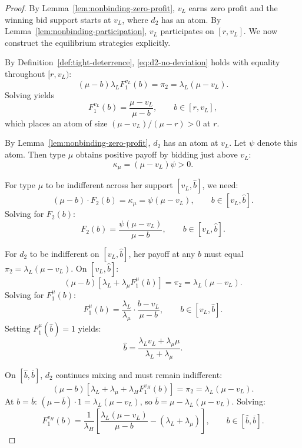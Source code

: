 \documentclass[11pt]{article}
\theoremstyle{plain}
\theoremstyle{definition}
\theoremstyle{plain}
\theoremstyle{plain}
\theoremstyle{plain}
\theoremstyle{plain}
\numberwithin{equation}{section}
\begin{document}
\begin{proof}
By Lemma~\ref{lem:nonbinding-zero-profit}, $v_L$ earns zero profit and the winning bid support starts at $v_L$, where $d_2$ has an atom. By Lemma~\ref{lem:nonbinding-participation}, $v_L$ participates on $[r, v_L]$. We now construct the equilibrium strategies explicitly.

\vspace{0.2cm}

\noindent By Definition~\ref{def:tight-deterrence}, \eqref{eq:d2-no-deviation} holds with equality throughout $[r, v_L)$:
\[
(\mu - b) \lambda_L F_1^{v_L}(b) = \pi_2 = \lambda_L(\mu - v_L).
\]
Solving yields
\[
F_1^{v_L}(b) = \frac{\mu - v_L}{\mu - b}, \qquad b \in [r, v_L],
\]
which places an atom of size $(\mu - v_L)/(\mu - r) > 0$ at $r$.
\vspace{0.2cm}

\noindent By Lemma~\ref{lem:nonbinding-zero-profit}, $d_2$ has an atom at $v_L$. Let $\psi$ denote this atom. Then type $\mu$ obtains positive payoff by bidding just above $v_L$:
\[
\kappa_{\mu} = (\mu - v_L) \psi > 0.
\]

\noindent For type $\mu$ to be indifferent across her support $[v_L, \hat{b}]$, we need:
\[
(\mu - b) \cdot F_2(b) = \kappa_{\mu} = \psi(\mu - v_L), \qquad b \in [v_L, \hat{b}].
\]
Solving for $F_2(b)$:
\[
F_2(b) = \frac{\psi(\mu - v_L)}{\mu - b}, \qquad b \in [v_L, \hat{b}].
\]

\noindent For $d_2$ to be indifferent on $[v_L, \hat{b}]$, her payoff at any $b$ must equal $\pi_2 = \lambda_L(\mu - v_L)$. On $[v_L, \hat{b}]$:
\[
(\mu - b)[\lambda_L + \lambda_{\mu} F_1^{\mu}(b)] = \pi_2 = \lambda_L(\mu - v_L).
\]
Solving for $F_1^{\mu}(b)$:
\[
F_1^{\mu}(b) = \frac{\lambda_L}{\lambda_{\mu}} \cdot \frac{b - v_L}{\mu - b}, \qquad b \in [v_L, \hat{b}].
\]
Setting $F_1^{\mu}(\hat{b}) = 1$ yields:
\[
\hat{b} = \frac{\lambda_L v_L + \lambda_{\mu} \mu}{\lambda_L + \lambda_{\mu}}.
\]

\vspace{0.2cm}

\noindent On $[\hat{b}, \overline{b}]$, $d_2$ continues mixing and must remain indifferent:
\[
(\mu - b)[\lambda_L + \lambda_{\mu} + \lambda_H F_1^{v_H}(b)] = \pi_2 = \lambda_L(\mu - v_L).
\]
At $b = \overline{b}$: $(\mu - \overline{b}) \cdot 1 = \lambda_L(\mu - v_L)$, so $\overline{b} = \mu - \lambda_L(\mu - v_L)$. Solving:
\[
F_1^{v_H}(b) = \frac{1}{\lambda_H}\left[\frac{\lambda_L(\mu - v_L)}{\mu - b} - (\lambda_L + \lambda_{\mu})\right], \qquad b \in [\hat{b}, \overline{b}].
\]


\end{proof}
\end{document}
